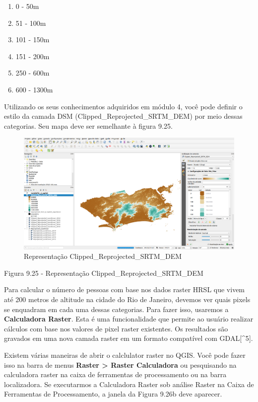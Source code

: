 \documentclass[
  portuguese,
]{krantz}
\providecommand{\tightlist}{%
  \setlength{\itemsep}{0pt}\setlength{\parskip}{0pt}}
\begin{document}
\begin{enumerate}
\def\labelenumi{\arabic{enumi}.}
\tightlist
\item
  0 - 50m
\item
  51 - 100m
\item
  101 - 150m
\item
  151 - 200m
\item
  250 - 600m
\item
  600 - 1300m
\end{enumerate}

Utilizando os seus conhecimentos adquiridos em módulo 4, você pode definir o estilo da camada DSM (Clipped\_Reprojected\_SRTM\_DEM) por meio dessas categorias. Seu mapa deve ser semelhante à figura 9.25.

\begin{figure}
\centering
\includegraphics{media/modulo9/fig925.png}
\caption{Representação Clipped\_Reprojected\_SRTM\_DEM}
\end{figure}

Figura 9.25 - Representação Clipped\_Reprojected\_SRTM\_DEM

Para calcular o número de pessoas com base nos dados raster HRSL que vivem até 200 metros de altitude na cidade do Rio de Janeiro, devemos ver quais pixels se enquadram em cada uma dessas categorias. Para fazer isso, usaremos a \textbf{Calculadora Raster}. Esta é uma funcionalidade que permite ao usuário realizar cálculos com base nos valores de pixel raster existentes. Os resultados são gravados em uma nova camada raster em um formato compatível com GDAL{[}\^{}5{]}.

Existem várias maneiras de abrir o calclulator raster no QGIS. Você pode fazer isso na barra de menus \textbf{Raster \textgreater{} Raster Calculadora} ou pesquisando na calculadora raster na caixa de ferramentas de processamento ou na barra localizadora. Se executarmos a Calculadora Raster sob análise Raster na Caixa de Ferramentas de Processamento, a janela da Figura 9.26b deve aparecer.
\end{document}
